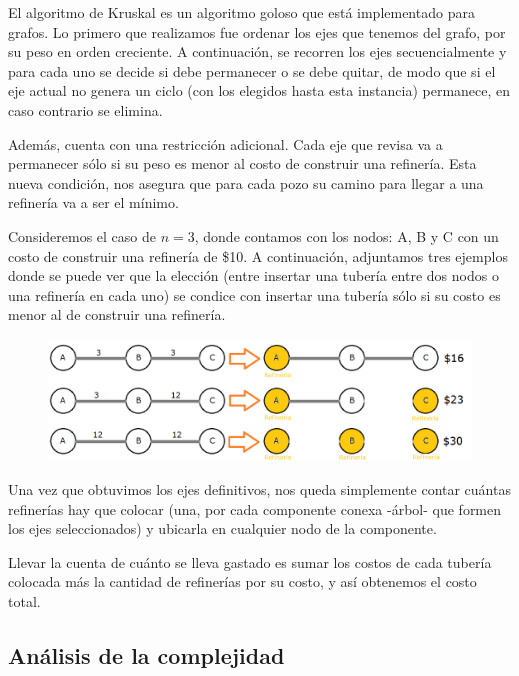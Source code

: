 El algoritmo de Kruskal es un algoritmo goloso que est\'a implementado para grafos. Lo primero que realizamos fue ordenar los ejes que tenemos del grafo, por su peso en orden creciente. A continuaci\'on, se recorren los ejes secuencialmente y para cada uno se decide si debe permanecer o se debe quitar, de modo que si el eje actual no genera un ciclo (con los elegidos hasta esta instancia) permanece, en caso contrario se elimina.

Adem\'as, cuenta con una restricci\'on adicional. Cada eje que revisa va a permanecer s\'olo si su peso es menor al costo de construir una refiner\'ia. Esta nueva condici\'on, nos asegura que para cada pozo su camino para llegar a una refiner\'ia va a ser el m\'inimo. 

Consideremos el caso de $n=3$, donde contamos con los nodos: A, B y C con un costo de construir una refiner\'ia de \$10. A continuaci\'on, adjuntamos tres ejemplos donde se puede ver que la elecci\'on (entre insertar una tuber\'ia entre dos nodos o una refiner\'ia en cada uno) se condice con insertar una tuber\'ia s\'olo si su costo es menor al de construir una refiner\'ia.

  \begin{figure}[h!]
   \begin{center}
 	\includegraphics[scale=0.5]{imagenes/ej3/grafos.png}
   \end{center}
 \end{figure}

\newpage

	Una vez que obtuvimos los ejes definitivos, nos queda simplemente contar cu\'antas refiner\'ias hay que colocar (una, por cada componente conexa -\'arbol- que formen los ejes seleccionados) y ubicarla en cualquier nodo de la componente.
	
	Llevar la cuenta de cu\'anto se lleva gastado es sumar los costos de cada tuber\'ia colocada m\'as la cantidad de refiner\'ias por su costo, y as\'i obtenemos el costo total.

\newpage
\subsection{An\'alisis de la complejidad}

